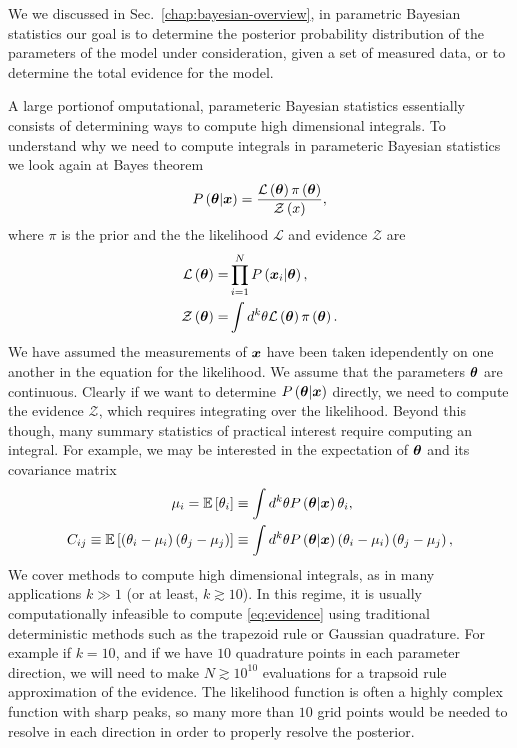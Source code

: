 We we discussed in Sec.~\ref{chap:bayesian-overview}, 
in parametric Bayesian statistics
our goal is to determine the posterior probability distribution of the
parameters of the model under consideration, given a set of measured data,
or to determine the total evidence for the model. 

A large portionof omputational, parameteric Bayesian statistics essentially consists of determining ways to compute high dimensional integrals.
To understand why we need to compute integrals in parameteric Bayesian statistics 
we look again at Bayes theorem
\begin{align}
    \label{eq:Bayes-theorem}
    P\left({\bm \theta}|{\bm x}\right)
    =
    \frac{
        \mathcal{L}\left({\bm \theta}\right)\pi\left({\bm \theta}\right)
    }{
        \mathcal{Z}\left(x\right)
    }
    ,
\end{align}
where $\pi$ is the prior and the the likelihood $\mathcal{L}$ and
evidence $\mathcal{Z}$ are
\begin{align}
    \label{eq:likelihood}
    \mathcal{L}\left({\bm \theta}\right)
    =&
    \prod_{i=1}^NP\left({\bm x}_i|{\bm \theta}\right)
    ,\\
    \label{eq:evidence}
    \mathcal{Z}\left({\bm \theta}\right)
    =&
    \int d^k\theta 
        \mathcal{L}\left({\bm \theta}\right)\pi\left({\bm \theta}\right)
    .
\end{align}
We have assumed the measurements of ${\bm x}$ have been taken idependently
on one another in the equation for the likelihood.
We assume that the parameters ${\bm \theta}$ are continuous.
Clearly if we want to determine $P\left({\bm \theta}|{\bm x}\right)$ directly, we need to compute the evidence $\mathcal{Z}$, which requires integrating over the likelihood.
Beyond this though, many summary statistics of practical interest require computing an integral.
For example, we may be interested in the expectation of ${\bm \theta}$ and its covariance matrix 
\begin{subequations}
\begin{align}
    \mu_i
    =
    \mathbb{E}\left[\theta_i\right]
    &\equiv
    \int d^k\theta P\left({\bm \theta}|{\bm x}\right)\theta_i 
    ,\\
    C_{ij}
    \equiv
    \mathbb{E}\left[\left(\theta_i-\mu_i\right)\left(\theta_j-\mu_j\right)\right]
    &\equiv
    \int d^k\theta P\left({\bm \theta}|{\bm x}\right)
        \left(\theta_i-\mu_i\right)\left(\theta_j-\mu_j\right) 
    ,
\end{align}
\end{subequations}
We cover methods to compute high dimensional integrals, as in many applications $k\gg1$ (or at least, $k\gtrsim10$).
In this regime, it is usually computationally infeasible to compute \eqref{eq:evidence} using traditional deterministic methods such as the trapezoid rule or Gaussian quadrature.
For example if $k=10$, and if we have $10$ quadrature points in each parameter direction, we will need to make $N\gtrsim 10^{10}$ evaluations for a trapsoid rule approximation of the evidence.
The likelihood function is often a highly complex function with sharp peaks,
so many more than $10$ grid points would be needed to resolve in each direction
in order to properly resolve the posterior.

